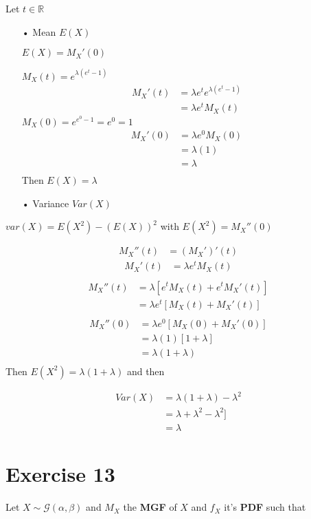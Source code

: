 \documentclass[11pt]{article}
\begin{document}
Let $t \in \mathbb{R}$
\begin{itemize}
\item[•]Mean $E(X)$

$E(X)=M_X'(0)$

$M_X(t)=e^{\lambda( e^t-1)}$
\begin{align*}
M_X'(t)&=\lambda e^{t}e^{\lambda( e^t-1)}\\
      &=\lambda e^{t}M_X(t)
\end{align*}
$M_X(0)=e^{e^{0}-1}=e^0=1$
\begin{align*}
M_X'(0)&=\lambda e^{0}M_X(0)\\
	   &=\lambda (1)\\
	   &=\lambda\\
\end{align*}
Then $E(X)=\lambda$

\item[•]Variance $Var(X)$
\end{itemize}
$var(X)=E(X^2)-(E(X))^2$ with $E(X^2)=M_X''(0)$

\begin{align*}
M_X''(t)&=(M_X')'(t)
\end{align*}
\begin{align*}
M_X'(t)&=\lambda e^{t}M_X(t)\\
\end{align*}
\begin{align*}
M_X''(t)&=\lambda[ e^{t}M_X(t)+e^{t}M_X'(t)]\\
&=\lambda e^{t}[ M_X(t)+M_X'(t)]\\
\end{align*}
\begin{align*}
M_X''(0)&=\lambda e^{0}[ M_X(0)+M_X'(0)]\\
        &=\lambda (1)[ 1+\lambda]\\
        &=\lambda (1+\lambda)\\
\end{align*}
Then $E(X^2)=\lambda (1+\lambda)$ and then 

\begin{align*}
Var(X)&=\lambda (1+\lambda)- \lambda ^2\\
        &=\lambda +\lambda ^2 -\lambda ^2]\\
        &=\lambda 
\end{align*}
\newpage 
\section{Exercise 13}
 Let $X  \sim \mathcal G(\alpha,\beta)$ and $M_X$ the \textbf{MGF} of $X$ and $f_X$ it's \textbf{PDF} such that
 
\end{document}
